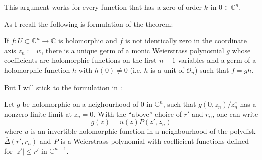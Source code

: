This argument works for every function that has a zero of order $k$ in
$0\in\mathbb{C}^n$.

As I recall the following is \cite{GH} formulation of the theorem:

\begin{theorem}
If $f:U\subset\mathbb{C}^n\to\mathbb{C}$ is holomorphic and $f$ is not
identically zero in the coordinate axis $z_n:=w$, there
is a unique germ of a monic Weierstrass polynomial $g$ whose coefficients are
holomorphic functions on the first $n-1$ variables 
and a germ of a holomorphic 
function $h$ with $h(0)\neq 0$ 
(i.e. $h$ is a unit of $\mathcal{O}_n$)
such that $f=gh$.
\end{theorem}

\noindent
But I will stick to the formulation in \cite{Demailly}:

\begin{theorem}
\label{theorem-weierstrass-preparation-theorem}
Let $g$ be holomorphic on a neighourhood of $0$ in $\mathbb{C}^n$,
such that $g(0,z_n)/z_n^s$ has a nonzero finite limit at $z_n=0$.
With the ``above'' choice of $r'$ and $r_n$,
one can write 
$$
g(z)=u(z)P(z',z_n)
$$
where $u$ is an invertible holomorphic function
in a neighbourhood of the polydisk $\overline{\Delta}(r',r_n)$ 
and $P$ is a Weierstrass polynomial with coefficient
functions defined for $|z'|\leq r'$ in $\mathbb{C}^{n-1}$.
\end{theorem}


